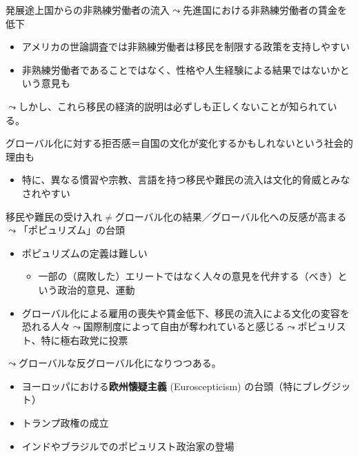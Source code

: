 \documentclass[
  xelatex,
  ja=standard]{bxjsarticle}
\providecommand{\tightlist}{%
  \setlength{\itemsep}{0pt}\setlength{\parskip}{0pt}}\usepackage{longtable,booktabs,array}
\begin{document}
発展途上国からの非熟練労働者の流入\(\leadsto\)先進国における非熟練労働者の賃金を低下

\begin{itemize}
\tightlist
\item
  アメリカの世論調査では非熟練労働者は移民を制限する政策を支持しやすい\citep{scheve2001}
\item
  非熟練労働者であることではなく、性格や人生経験による結果ではないかという意見も\citep{hainmueller2014}
\end{itemize}

\(\leadsto\)しかし、これら移民の経済的説明は必ずしも正しくないことが知られている。

グローバル化に対する拒否感＝自国の文化が変化するかもしれないという社会的理由も\citep{margalit2012}

\begin{itemize}
\tightlist
\item
  特に、異なる慣習や宗教、言語を持つ移民や難民の流入は文化的脅威とみなされやすい\citep{hainmueller2014}
\end{itemize}

移民や難民の受け入れ\(\neq\)グローバル化の結果／グローバル化への反感が高まる\(\leadsto\)「ポピュリズム」の台頭

\begin{itemize}
\tightlist
\item
  ポピュリズムの定義は難しい\citep{mudde2004}

  \begin{itemize}
  \tightlist
  \item
    一部の（腐敗した）エリートではなく人々の意見を代弁する（べき）という政治的意見、運動
  \end{itemize}
\item
  グローバル化による雇用の喪失や賃金低下、移民の流入による文化の変容を恐れる人々\(\leadsto\)国際制度によって自由が奪われていると感じる\(\leadsto\)ポピュリスト、特に極右政党に投票\citep{colantone2018, becker2016}
\end{itemize}

\(\leadsto\)グローバルな反グローバル化になりつつある。

\begin{itemize}
\tightlist
\item
  ヨーロッパにおける\textbf{欧州懐疑主義} (Euroscepticism)
  の台頭（特にブレグジット）
\item
  トランプ政権の成立
\item
  インドやブラジルでのポピュリスト政治家の登場
\end{itemize}
\end{document}
